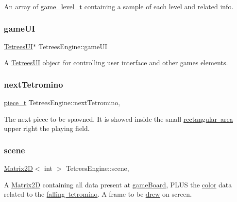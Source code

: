 An array of \mbox{\hyperlink{structgame__level__t}{game\+\_\+level\+\_\+t}} containing a sample of each level and related info. \mbox{\label{classTetreesEngine_a01bf1d438236d5f57129ffb22adf59ce}} 
\subsubsection{\texorpdfstring{game\+UI}{gameUI}}
{\footnotesize\ttfamily \mbox{\hyperlink{classTetreesUI}{Tetrees\+UI}}$\ast$ Tetrees\+Engine\+::game\+UI\hspace{0.3cm}{\ttfamily [private]}}

A \mbox{\hyperlink{classTetreesUI}{Tetrees\+UI}} object for controlling user interface and other game\textquotesingle{}s elements. \mbox{\label{classTetreesEngine_a44c902481f5d8a72ca8a78d24f5c3a33}} 
\subsubsection{\texorpdfstring{next\+Tetromino}{nextTetromino}}
{\footnotesize\ttfamily \mbox{\hyperlink{structpiece__t}{piece\+\_\+t}} Tetrees\+Engine\+::next\+Tetromino\hspace{0.3cm}{\ttfamily [static]}, {\ttfamily [private]}}

The next piece to be spawned. It is showed inside the small \mbox{\hyperlink{TetreesUI_8cpp_aac997784ac88b494498d6e08d6fe62d5}{rectangular area}} upper right the playing field. \mbox{\label{classTetreesEngine_aeade477c0bc2eaaa894ebbdaca93584e}} 
\subsubsection{\texorpdfstring{scene}{scene}}
{\footnotesize\ttfamily \mbox{\hyperlink{classMatrix2D}{Matrix2D}}$<$ int $>$ Tetrees\+Engine\+::scene\hspace{0.3cm}{\ttfamily [static]}, {\ttfamily [private]}}

A \mbox{\hyperlink{classMatrix2D}{Matrix2D}} containing all data present at \mbox{\hyperlink{classTetreesEngine_a37d082a7816d6731b2703dd6d1a1cb97}{game\+Board}}, P\+L\+US the \mbox{\hyperlink{TetreesDefs_8hpp_a8ba5fbce2446135735693ab60c896bbd}{color}} data related to the \mbox{\hyperlink{classTetreesEngine_a26435ee2f02d9ba70d9e359745114f6e}{falling tetromino}}. A frame to be \mbox{\hyperlink{classTetreesUI_a357ae7240cc5f35b5d61244e7a6bcfe3}{drew}} on screen. \mbox{\label{classTetreesEngine_a26435ee2f02d9ba70d9e359745114f6e}} 
